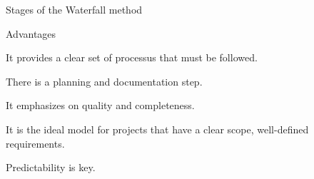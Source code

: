 \begin{frame}{Stages of the Waterfall method}    
    \begin{exampleblock}{Advantages}
        \item It provides a clear set of processus that must be followed.
        
        \item There is a planning and documentation step.
        
        \item It emphasizes on quality and completeness.
        
        \item It is the ideal model for projects that have a clear scope, well-defined requirements.
        
        \item Predictability is key.
     
    \end{exampleblock}

    \end{frame}
